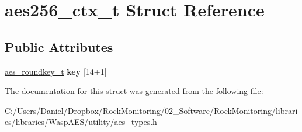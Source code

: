 \hypertarget{structaes256__ctx__t}{}\section{aes256\+\_\+ctx\+\_\+t Struct Reference}
\label{structaes256__ctx__t}
\subsection*{Public Attributes}
\begin{DoxyCompactItemize}
\item 
\hyperlink{structaes__roundkey__t}{aes\+\_\+roundkey\+\_\+t} {\bfseries key} \mbox{[}14+1\mbox{]}\hypertarget{structaes256__ctx__t_a797c800e7cfb84ecdb2844d5efebd891}{}\label{structaes256__ctx__t_a797c800e7cfb84ecdb2844d5efebd891}

\end{DoxyCompactItemize}


The documentation for this struct was generated from the following file\+:\begin{DoxyCompactItemize}
\item 
C\+:/\+Users/\+Daniel/\+Dropbox/\+Rock\+Monitoring/02\+\_\+\+Software/\+Rock\+Monitoring/libraries/libraries/\+Wasp\+A\+E\+S/utility/\hyperlink{aes__types_8h}{aes\+\_\+types.\+h}\end{DoxyCompactItemize}
